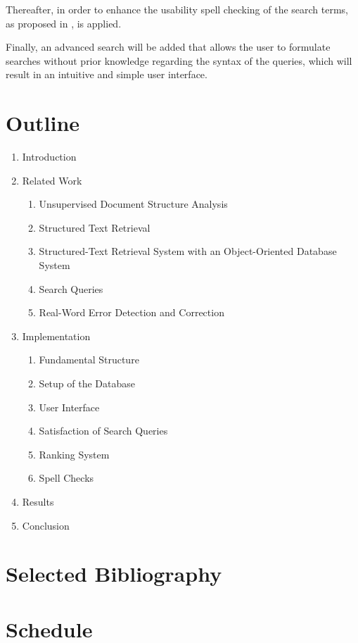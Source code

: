 \documentclass[a4paper, 12pt]{scrartcl}
\begin{document}
Thereafter, in order to enhance the usability spell checking of the search terms, as proposed in \cite{SPCB13}, is applied.

Finally, an advanced search will be added that allows the user to formulate searches without prior knowledge regarding the syntax of the queries, which will result in
an intuitive and simple user interface.

\section{Outline}

\begin{enumerate}
 \item Introduction
 \item Related Work
 \begin{enumerate}
  \item Unsupervised Document Structure Analysis
  \item Structured Text Retrieval
  \item Structured-Text Retrieval System with an Object-Oriented Database System
  \item Search Queries
  \item Real-Word Error Detection and Correction
 \end{enumerate}
 \item Implementation
 \begin{enumerate}
  \item Fundamental Structure
  \item Setup of the Database
  \item User Interface
  \item Satisfaction of Search Queries
  \item Ranking System
  \item Spell Checks
 \end{enumerate}
 \item Results
 \item Conclusion
\end{enumerate}

\section{Selected Bibliography}


\nocite{*}

\section{Schedule}
\end{document}
